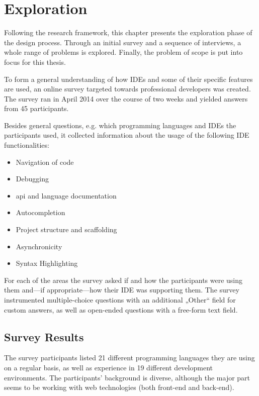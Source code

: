 \chapter{Exploration}\label{exploration}

Following the research framework, this chapter presents the exploration
phase of the design process. Through an initial survey and a sequence of
interviews, a whole range of problems is explored. Finally, the problem
of scope is put into focus for this thesis.

To form a general understanding of how IDEs and some of their specific
features are used, an online survey targeted towards professional
developers was created. The survey ran in April 2014 over the course of
two weeks and yielded answers from 45 participants.

Besides general questions, e.g. which programming languages and IDEs the
participants used, it collected information about the usage of the
following IDE functionalities:

\begin{itemize}
\itemsep1pt\parskip0pt
\item
  Navigation of code
\item
  Debugging
\item
  \ac{api} and language documentation
\item
  Autocompletion
\item
  Project structure and scaffolding
\item
  Asynchronicity
\item
  Syntax Highlighting
\end{itemize}

For each of the areas the survey asked if and how the participants were
using them and—if appropriate—how their IDE was supporting them. The
survey instrumented multiple-choice questions with an additional „Other“
field for custom answers, as well as open-ended questions with a
free-form text field.

\section{Survey Results}\label{survey-results}

The survey participants listed 21 different programming languages they
are using on a regular basis, as well as experience in 19 different
development environments. The participants’ background is diverse,
although the major part seems to be working with web technologies (both
front-end and back-end).

